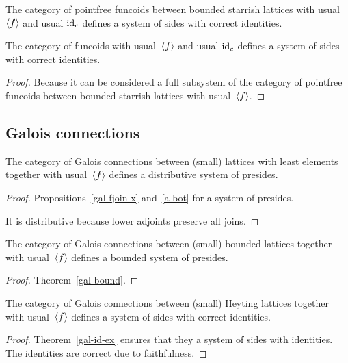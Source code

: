 \begin{obvious}
The category of pointfree funcoids between bounded starrish lattices with usual~$\left\langle f\right\rangle$ and usual $\operatorname{id}_c$ defines a system of sides with correct identities.
\end{obvious}

\begin{prop}
The category of funcoids with usual~$\left\langle f\right\rangle$ and usual $\operatorname{id}_c$ defines a system of sides with correct identities.
\end{prop}

\begin{proof}
Because it can be considered a full subsystem of
the category of pointfree funcoids between bounded starrish lattices with usual~$\left\langle f\right\rangle$.
\end{proof}

\subsection{Galois connections}

\begin{prop}
The category of Galois connections between (small) lattices with least elements together with usual~$\left\langle f\right\rangle$
defines a distributive system of presides.
\end{prop}

\begin{proof}
Propositions~\ref{gal-fjoin-x} and~\ref{a-bot} for a system of presides.

It is distributive because lower adjoints preserve all joins.
\end{proof}

\begin{prop}
The category of Galois connections between (small) bounded lattices together with usual~$\left\langle f\right\rangle$
defines a bounded system of presides.
\end{prop}

\begin{proof}
Theorem~\ref{gal-bound}.
\end{proof}

\begin{prop}
The category of Galois connections between (small) Heyting lattices together with usual~$\left\langle f\right\rangle$
defines a system of sides with correct identities.
\end{prop}

\begin{proof}
Theorem~\ref{gal-id-ex} ensures that they a system of sides with identities. The identities are correct due to faithfulness.
\end{proof}

